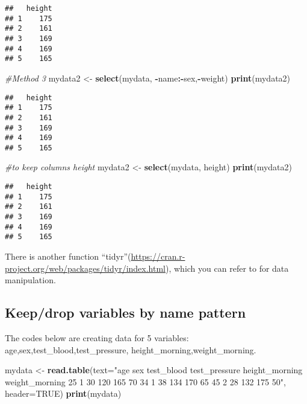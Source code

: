 \documentclass[]{book}
\newenvironment{Shaded}{\begin{snugshade}}{\end{snugshade}}
\newcommand{\KeywordTok}[1]{\textcolor[rgb]{0.13,0.29,0.53}{\textbf{#1}}}
\newcommand{\DataTypeTok}[1]{\textcolor[rgb]{0.13,0.29,0.53}{#1}}
\newcommand{\StringTok}[1]{\textcolor[rgb]{0.31,0.60,0.02}{#1}}
\newcommand{\CommentTok}[1]{\textcolor[rgb]{0.56,0.35,0.01}{\textit{#1}}}
\newcommand{\OtherTok}[1]{\textcolor[rgb]{0.56,0.35,0.01}{#1}}
\newcommand{\OperatorTok}[1]{\textcolor[rgb]{0.81,0.36,0.00}{\textbf{#1}}}
\newcommand{\NormalTok}[1]{#1}
\theoremstyle{definition}
\theoremstyle{definition}
\theoremstyle{definition}
\theoremstyle{remark}
\begin{document}
\begin{verbatim}
##   height
## 1    175
## 2    161
## 3    169
## 4    169
## 5    165
\end{verbatim}

\begin{Shaded}
\begin{Highlighting}[]
\CommentTok{#Method 3}
\NormalTok{mydata2 <-}\StringTok{ }\KeywordTok{select}\NormalTok{(mydata, }\OperatorTok{-}\NormalTok{name}\OperatorTok{:-}\NormalTok{sex,}\OperatorTok{-}\NormalTok{weight)}
\KeywordTok{print}\NormalTok{(mydata2)}
\end{Highlighting}
\end{Shaded}

\begin{verbatim}
##   height
## 1    175
## 2    161
## 3    169
## 4    169
## 5    165
\end{verbatim}

\begin{Shaded}
\begin{Highlighting}[]
\CommentTok{#to keep columns height}
\NormalTok{mydata2 <-}\StringTok{ }\KeywordTok{select}\NormalTok{(mydata, height)}
\KeywordTok{print}\NormalTok{(mydata2)}
\end{Highlighting}
\end{Shaded}

\begin{verbatim}
##   height
## 1    175
## 2    161
## 3    169
## 4    169
## 5    165
\end{verbatim}

There is another function
``tidyr''(\url{https://cran.r-project.org/web/packages/tidyr/index.html}),
which you can refer to for data manipulation.

\subsection{Keep/drop variables by name
pattern}\label{keepdrop-variables-by-name-pattern}

The codes below are creating data for 5 variables:
age,sex,test\_blood,test\_pressure, height\_morning,weight\_morning.

\begin{Shaded}
\begin{Highlighting}[]
\NormalTok{mydata <-}\StringTok{ }\KeywordTok{read.table}\NormalTok{(}\DataTypeTok{text=}\StringTok{"age sex test_blood test_pressure height_morning weight_morning}
\StringTok{25 1 30 120 165 70}
\StringTok{34 1 38 134 170 65}
\StringTok{45 2 28 132 175 50"}\NormalTok{, }\DataTypeTok{header=}\OtherTok{TRUE}\NormalTok{)}
\KeywordTok{print}\NormalTok{(mydata)}
\end{Highlighting}
\end{Shaded}
\end{document}
